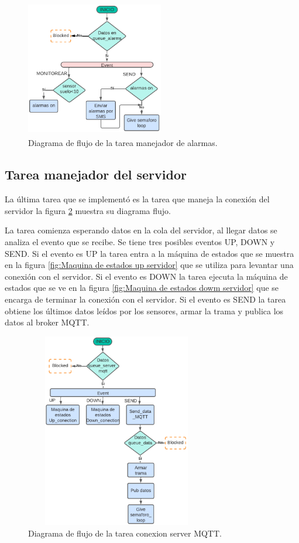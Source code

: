 \begin{figure}[h]
  \centering
	\includegraphics[width=6cm, height=6cm]{./Figures/DF_alarms.png}
	\caption{Diagrama de flujo de la tarea manejador de alarmas.}
	\label{fig:Df tarea alarmas}
\end{figure}

\subsection{Tarea manejador del servidor } 
La última tarea que se implementó es la tarea que maneja la conexión del servidor la figura \ref{fig:Df tarea conexion} muestra su diagrama flujo.

La tarea comienza esperando datos en la cola del servidor, al llegar datos se analiza el evento que se recibe. Se tiene tres posibles eventos UP, DOWN y SEND. Si el evento es UP la tarea entra a la máquina de estados que se muestra en la figura \ref{fig:Maquina de estados up servidor} que se utiliza para levantar una conexión con el servidor. Si el evento es DOWN la tarea ejecuta la máquina de estados que se ve en la figura \ref{fig:Maquina de estados dowm servidor} que se encarga de terminar la conexión con el servidor. Si el evento es SEND la tarea obtiene los últimos datos leídos por los sensores, armar la trama y publica los datos al broker MQTT. 
\begin{figure}[h]
  \centering
	\includegraphics[width=8cm, height=8.5cm]{./Figures/DF general task conection.png}
	\caption{Diagrama de flujo de la tarea conexion server MQTT.}
	\label{fig:Df tarea conexion}
\end{figure}

